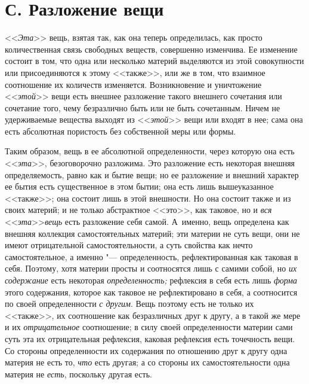 \section[С. Разложение вещи]{С. Разложение вещи}

<<{\em Эта}>> вещь, взятая
так, как она теперь определилась, как просто количественная связь свободных
веществ, совершенно изменчива. Ее изменение состоит в том, что одна или
несколько материй выделяются из этой совокупности или присоединяются к
этому <<также>>, или же в том, что взаимное соотношение их количеств
изменяется. Возникновение и уничтожение <<{\em этой}>>
вещи есть внешнее разложение такого внешнего сочетания или сочетание того,
чему безразлично быть или не быть сочетанным. Ничем не удерживаемые
вещества выходят из <<{\em этой}>> вещи или входят в нее;
сама она есть абсолютная пористость без собственной меры или формы.

Таким образом, вещь в ее абсолютной определенности, через которую она есть
<<{\em эта}>>, безоговорочно разложима. Это разложение
есть некоторая внешняя определяемость, равно как и бытие вещи; но ее
разложение и внешний характер ее бытия есть существенное в этом бытии; она
есть лишь вышеуказанное <<также>>; она состоит лишь в этой внешности. Но она
состоит также и из своих материй; и не только абстрактное <<это>>, как
таковое, но и {\em вся}
<<{\em эта}>>{\em вещь} есть
разложение себя самой. А~именно, вещь определена как внешняя коллекция
самостоятельных материй; эти материи не суть вещи, они не имеют
отрицательной самостоятельности, а суть свойства как нечто самостоятельное,
а именно "--- определенность, рефлектированная как таковая в себя. Поэтому,
хотя материи просты и соотносятся лишь с самими собой, но
{\em их содержание} есть некоторая
{\em определенность;} рефлексия в себя есть лишь
{\em форма} этого содержания, которое как таковое не
рефлектировано в себя, а соотносится по своей определенности
{\em с другим}. Вещь поэтому есть не только их <<также>>,
их соотношение как безразличных друг к другу, а в такой же мере и их
{\em отрицательное} соотношение; в силу своей
определенности материи сами суть эта их отрицательная рефлексия, каковая
рефлексия есть точечность вещи. Со стороны определенности их содержания по
отношению друг к другу одна материя не есть то,
{\em что} есть другая; а со стороны их
самостоятельности одна материя не {\em есть}, поскольку другая есть.

